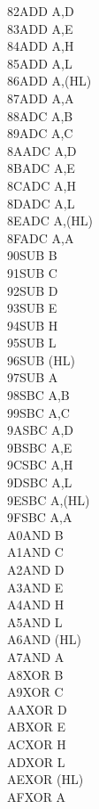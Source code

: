 \begin{multicols}{3}
{\begin{tabbing}
    82\>ADD A,D\\
    83\>ADD A,E\\
    84\>ADD A,H\\
    85\>ADD A,L\\
    86\>ADD A,(HL)\\
    87\>ADD A,A\\
    88\>ADC A,B\\
    89\>ADC A,C\\
    8A\>ADC A,D\\
    8B\>ADC A,E\\
    8C\>ADC A,H\\
    8D\>ADC A,L\\
    8E\>ADC A,(HL)\\
    8F\>ADC A,A\\
    90\>SUB B\\
    91\>SUB C\\
    92\>SUB D\\
    93\>SUB E\\
    94\>SUB H\\
    95\>SUB L\\
    96\>SUB (HL)\\
    97\>SUB A\\
    98\>SBC A,B\\
    99\>SBC A,C\\
    9A\>SBC A,D\\
    9B\>SBC A,E\\
    9C\>SBC A,H\\
    9D\>SBC A,L\\
    9E\>SBC A,(HL)\\
    9F\>SBC A,A\\
    A0\>AND B\\
    A1\>AND C\\
    A2\>AND D\\
    A3\>AND E\\
    A4\>AND H\\
    A5\>AND L\\
    A6\>AND (HL)\\
    A7\>AND A\\
    A8\>XOR B\\
    A9\>XOR C\\
    AA\>XOR D\\
    AB\>XOR E\\
    AC\>XOR H\\
    AD\>XOR L\\
    AE\>XOR (HL)\\
    AF\>XOR A\\

\end{tabbing}}
\end{multicols}
